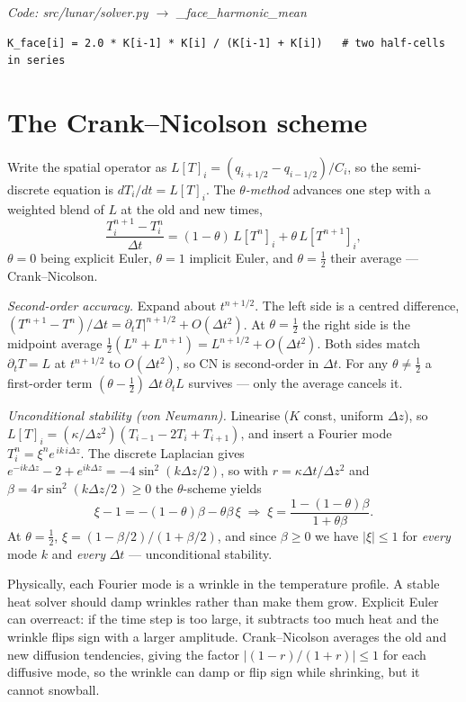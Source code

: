 \documentclass[11pt]{report}
\newcommand{\code}[1]{{\ttfamily\small #1}}
\begin{document}
{\small\color{dim}\textit{Code: \code{src/lunar/solver.py} $\to$ \code{\_face\_harmonic\_mean}}}
\begin{lstlisting}[style=py]
K_face[i] = 2.0 * K[i-1] * K[i] / (K[i-1] + K[i])   # two half-cells in series
\end{lstlisting}

\section{The Crank--Nicolson scheme}\label{app:cn}
Write the spatial operator as $L[T]_i = (q_{i+1/2}-q_{i-1/2})/C_i$, so the
semi-discrete equation is $dT_i/dt=L[T]_i$. The \emph{$\theta$-method} advances
one step with a weighted blend of $L$ at the old and new times,
\[
\frac{T_i^{n+1}-T_i^{n}}{\Delta t}
= (1-\theta)\,L[T^{n}]_i + \theta\,L[T^{n+1}]_i,
\]
$\theta=0$ being explicit Euler, $\theta=1$ implicit Euler, and
$\theta=\tfrac12$ their average --- Crank--Nicolson.

\emph{Second-order accuracy.} Expand about $t^{n+1/2}$. The left side is a centred
difference, $(T^{n+1}-T^n)/\Delta t=\partial_t T|^{n+1/2}+O(\Delta t^2)$. At
$\theta=\tfrac12$ the right side is the midpoint average
$\tfrac12(L^n+L^{n+1})=L^{n+1/2}+O(\Delta t^2)$. Both sides match
$\partial_t T=L$ at $t^{n+1/2}$ to $O(\Delta t^2)$, so CN is second-order in
$\Delta t$. For any $\theta\neq\tfrac12$ a first-order term
$(\theta-\tfrac12)\,\Delta t\,\partial_t L$ survives --- only the average cancels it.

\emph{Unconditional stability (von Neumann).} Linearise ($K$ const, uniform
$\Delta z$), so $L[T]_i=(\kappa/\Delta z^2)(T_{i-1}-2T_i+T_{i+1})$, and insert a
Fourier mode $T_i^n=\xi^n e^{\,ik\,i\Delta z}$. The discrete Laplacian gives
$e^{-ik\Delta z}-2+e^{ik\Delta z}=-4\sin^2(k\Delta z/2)$, so with $r=\kappa\Delta
t/\Delta z^2$ and $\beta=4r\sin^2(k\Delta z/2)\ge0$ the $\theta$-scheme yields
\[
\xi-1=-(1-\theta)\beta-\theta\beta\,\xi
\;\Rightarrow\;
\xi=\frac{1-(1-\theta)\beta}{1+\theta\beta}.
\]
At $\theta=\tfrac12$, $\xi=(1-\beta/2)/(1+\beta/2)$, and since $\beta\ge0$ we have
$|\xi|\le1$ for \emph{every} mode $k$ and \emph{every} $\Delta t$ --- unconditional
stability.

\begin{plain}
Physically, each Fourier mode is a wrinkle in the temperature profile. A stable
heat solver should damp wrinkles rather than make them grow. Explicit Euler can
overreact: if the time step is too large, it subtracts too much heat and the
wrinkle flips sign with a larger amplitude. Crank--Nicolson averages the old and
new diffusion tendencies, giving the factor $|(1-r)/(1+r)|\le1$ for each
diffusive mode, so the wrinkle can damp or flip sign while shrinking, but it
cannot snowball.
\end{plain}
\end{document}
